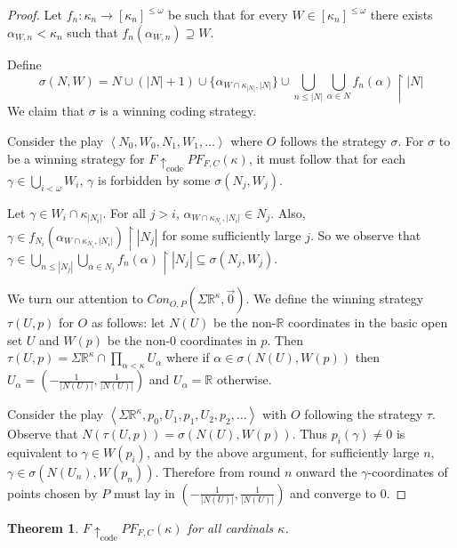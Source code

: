 \documentclass[11pt]{article}
\theoremstyle{plain}
\newtheorem{theorem}{Theorem}
\theoremstyle{definition}
\theoremstyle{remark}
\newcommand{\codewin}{\uparrow_{\text{code}}}
\newcommand{\congame}[2]{Con_{O,P}(#1,#2)}
\newcommand{\pfgame}[1]{PF_{F,C}(#1)}
\newcommand{\sigmaprodr}[1]{\Sigma\mathbb{R}^{#1}}
\begin{document}
\begin{proof}
Let $f_n:\kappa_n\to[\kappa_n]^{\leq\omega}$ be such that for every $W\in[\kappa_n]^{\leq\omega}$ there exists $\alpha_{W,n}<\kappa_n$ such that $f_n(\alpha_{W,n})\supseteq W$.

Define \[\sigma(N,W)=N\cup(|N|+1)\cup\{\alpha_{W\cap \kappa_{|N|},|N|}\}\cup\bigcup_{n\leq|N|}\bigcup_{\alpha\in N} f_n(\alpha)\restriction |N|\] We claim that $\sigma$ is a winning coding strategy.

Consider the play $\left<N_0,W_0,N_1,W_1,\dots\right>$ where $O$ follows the strategy $\sigma$. For $\sigma$ to be a winning strategy for $F \codewin PF_{F,C}(\kappa)$, it must follow that for each $\gamma\in\bigcup_{i<\omega}W_i$, $\gamma$ is forbidden by some $\sigma(N_j,W_j)$. 

Let $\gamma\in W_i\cap \kappa_{|N_i|}$. For all $j>i$, $\alpha_{W\cap\kappa_{N_i},|N_i|}\in N_j$. Also, $\gamma \in f_{N_i}(\alpha_{W\cap\kappa_{N_i},|N_i|})\restriction|N_j|$ for some sufficiently large $j$. So we observe that $\gamma \in \bigcup_{n\leq|N_j|}\bigcup_{\alpha\in N_j} f_n(\alpha)\restriction |N_j|\subseteq \sigma(N_j,W_j)$.

We turn our attention to $\congame{\sigmaprodr{\kappa}}{\vec{0}}$. We define the winning strategy $\tau(U,p)$ for $O$ as follows: let $N(U)$ be the non-$\mathbb{R}$ coordinates in the basic open set $U$ and $W(p)$ be the non-$0$ coordinates in $p$. Then $\tau(U,p) =\Sigma\mathbb{R}^\kappa \cap \prod_{\alpha<\kappa} U_\alpha$ where if $\alpha \in \sigma(N(U),W(p))$ then $U_\alpha = (-\frac{1}{|N(U)|},\frac{1}{|N(U)|})$ and $U_\alpha=\mathbb{R}$ otherwise.

Consider the play $\left<\sigmaprodr{\kappa},p_0,U_1,p_1,U_2,p_2,\dots\right>$ with $O$ following the strategy $\tau$. Observe that $N(\tau(U,p))=\sigma(N(U),W(p))$. Thus $p_i(\gamma)\not=0$ is equivalent to $\gamma \in W(p_i)$, and by the above argument, for sufficiently large $n$, $\gamma \in \sigma(N(U_n),W(p_n))$. Therefore from round $n$ onward the $\gamma$-coordinates of points chosen by $P$ must lay in $(-\frac{1}{|N(U)|},\frac{1}{|N(U)|})$ and converge to $0$.
\end{proof}

\begin{theorem}
$F\codewin\pfgame{\kappa}$ for all cardinals $\kappa$.
\end{theorem}
\end{document}
